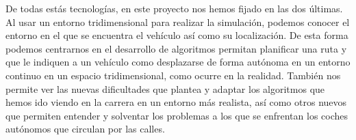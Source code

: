 De todas estás tecnologías, en este proyecto nos hemos fijado en las dos últimas. Al usar un entorno tridimensional para realizar la simulación, podemos conocer el entorno en el que se encuentra el vehículo así como su localización. De esta forma podemos centrarnos en el desarrollo de algoritmos permitan planificar una ruta y que le indiquen a un vehículo como desplazarse de forma autónoma en un entorno continuo en un espacio tridimensional, como ocurre en la realidad. También nos permite ver las nuevas dificultades que plantea y adaptar los algoritmos que hemos ido viendo en la carrera en un entorno más realista, así como otros nuevos que permiten entender y solventar los problemas a los que se enfrentan los coches autónomos que circulan por las calles.
